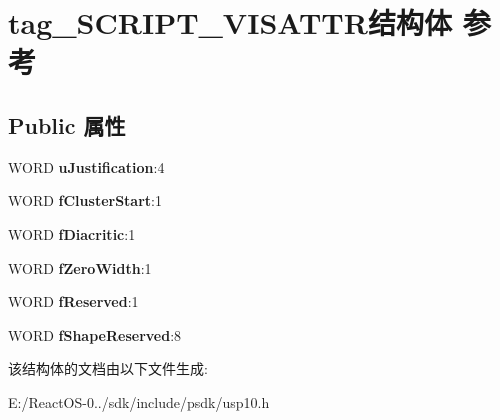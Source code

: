 \hypertarget{structtag___s_c_r_i_p_t___v_i_s_a_t_t_r}{}\section{tag\+\_\+\+S\+C\+R\+I\+P\+T\+\_\+\+V\+I\+S\+A\+T\+T\+R结构体 参考}
\label{structtag___s_c_r_i_p_t___v_i_s_a_t_t_r}
\subsection*{Public 属性}
\begin{DoxyCompactItemize}
\item 
\mbox{\label{structtag___s_c_r_i_p_t___v_i_s_a_t_t_r_a1551514c4004f2a4c0110b280ee194e4}} 
W\+O\+RD {\bfseries u\+Justification}\+:4
\item 
\mbox{\label{structtag___s_c_r_i_p_t___v_i_s_a_t_t_r_a4c22d3e79096afac08d649dfff29b563}} 
W\+O\+RD {\bfseries f\+Cluster\+Start}\+:1
\item 
\mbox{\label{structtag___s_c_r_i_p_t___v_i_s_a_t_t_r_a44220ce3a458f3f836f4c27a9e4220e6}} 
W\+O\+RD {\bfseries f\+Diacritic}\+:1
\item 
\mbox{\label{structtag___s_c_r_i_p_t___v_i_s_a_t_t_r_a9244512e3df4015a180573cb5756dc3a}} 
W\+O\+RD {\bfseries f\+Zero\+Width}\+:1
\item 
\mbox{\label{structtag___s_c_r_i_p_t___v_i_s_a_t_t_r_a8abad3c838aeeab00e548747e4d140c6}} 
W\+O\+RD {\bfseries f\+Reserved}\+:1
\item 
\mbox{\label{structtag___s_c_r_i_p_t___v_i_s_a_t_t_r_a7d9fc01e9426ba163059a4d296483b9a}} 
W\+O\+RD {\bfseries f\+Shape\+Reserved}\+:8
\end{DoxyCompactItemize}


该结构体的文档由以下文件生成\+:\begin{DoxyCompactItemize}
\item 
E\+:/\+React\+O\+S-\/0../sdk/include/psdk/usp10.\+h\end{DoxyCompactItemize}

